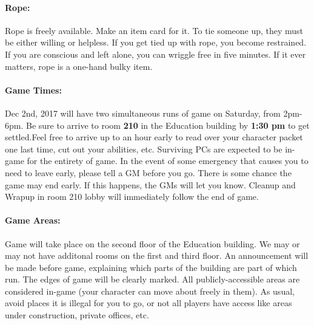 \documentclass[sheet]{airship}
\begin{document}
\paragraph{Rope:} Rope is freely available.  Make an item card for it.
To tie someone up, they must be either willing or helpless.  If you
get tied up with rope, you become restrained.  If you are conscious
and left alone, you can wriggle free in five minutes.  If it ever matters, rope is a one-hand bulky item.

\paragraph{Game Times:} Dec 2nd, 2017 will have two simultaneous runs of game on Saturday, from 2pm-6pm. Be sure
to arrive to room {\bf 210} in the Education building by {\bf 1:30 pm} to get settled.Feel free to arrive up to an hour early to read over your character packet one last time, cut out your abilities, etc. Surviving PCs are expected to be in-game for the 
entirety of game.  In the event of some
emergency that causes you to need to leave early, please tell a GM
before you go.  There is some chance the game may end early.  If this
happens, the GMs will let you know.  Cleanup and Wrapup in room 210 lobby will
immediately follow the end of game.

\paragraph{Game Areas:} Game will take place on the second floor of the Education building. We may or may not have additonal rooms on the first and third floor. An announcement will be made before game, explaining which parts of the building are part of which run. The edges of game will be clearly marked.  All publicly-accessible areas are
considered in-game (your character can move about freely in them).  As
usual, avoid places it is illegal for you to go, or not all players have access like areas under
construction, private offices, etc.


\end{document}
